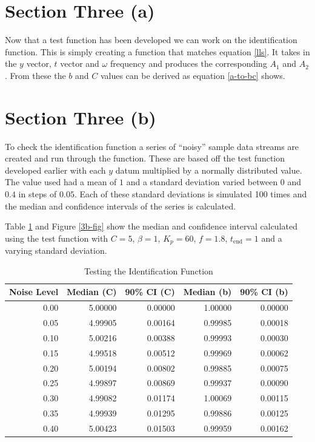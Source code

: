 \section*{Section Three (a)}

Now that a test function has been developed we can work on the identification
function.  This is simply creating a function that matches equation \ref{lls}.
It takes in the $y$ vector, $t$ vector and $\omega$ frequency and produces the
corresponding $A_1$ and $A_2$.  From these the $b$ and $C$ values can be derived
as equation \ref{a-to-bc} shows.

\section*{Section Three (b)}

To check the identification function a series of ``noisy'' sample data streams
are created and run through the function.  These are based off the test function
developed earlier with each $y$ datum multiplied by a normally distributed
value.  The value used had a mean of $1$ and a standard deviation varied between
$0$ and $0.4$ in steps of $0.05$.  Each of these standard deviations is
simulated 100 times and the median and confidence intervals of the series is
calculated.

Table \ref{3b} and Figure \ref{3b-fig} show the median and confidence interval
calculated using the test function with $C = 5$, $\beta = 1$, $K_p = 60$, $f =
1.8$, $t_\text{end} = 1$ and a varying standard deviation.

\begin{table}
\centering
\begin{tabular}{r|r|r|r|r}
Noise Level & Median (C) & 90\% CI (C) & Median (b) & 90\% CI (b) \\
\hline
0.00 & 5.00000 & 0.00000 & 1.00000 & 0.00000 \\
0.05 & 4.99905 & 0.00164 & 0.99985 & 0.00018 \\
0.10 & 5.00216 & 0.00388 & 0.99993 & 0.00030 \\
0.15 & 4.99518 & 0.00512 & 0.99969 & 0.00062 \\
0.20 & 5.00194 & 0.00802 & 0.99885 & 0.00075 \\
0.25 & 4.99897 & 0.00869 & 0.99937 & 0.00090 \\
0.30 & 4.99082 & 0.01174 & 1.00069 & 0.00115 \\
0.35 & 4.99939 & 0.01295 & 0.99886 & 0.00125 \\
0.40 & 5.00423 & 0.01503 & 0.99959 & 0.00162  
\end{tabular}
\caption{Testing the Identification Function\label{3b}}
\end{table}

